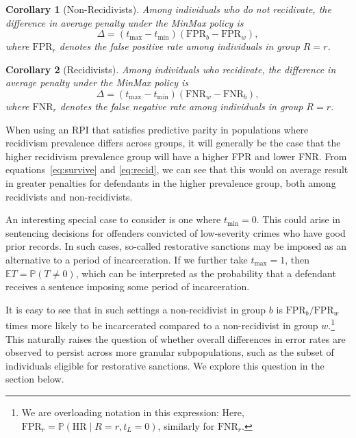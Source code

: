 \documentclass[11pt, svgnames]{article}
\newcommand{\E}{\mathbb{E}}
\renewcommand{\P}{\mathbb{P}}
\newcommand{\fpr}{\mathrm{FPR}}
\newcommand{\fnr}{\mathrm{FNR}}
\numberwithin{equation}{section}
\theoremstyle{plain}
\newtheorem{corollary}{Corollary}
\theoremstyle{definition}
\numberwithin{prop}{section}
\numberwithin{corollary}{section}
\begin{document}
\begin{corollary}[Non-Recidivists]
  Among individuals who \emph{do not recidivate}, the difference in average penalty under the MinMax policy is 
  \begin{equation}
    \Delta = (t_\mathrm{max} - t_\mathrm{min})(\fpr_b - \fpr_w),
    \label{eq:survive}
  \end{equation}
  where $\fpr_r$ denotes the false positive rate among individuals in group $R = r$.  
  \label{cor:nonrecid}
\end{corollary}
%
\begin{corollary}[Recidivists]
  Among individuals who \emph{recidivate}, the difference in average penalty under the MinMax policy is 
  \begin{equation}
    \Delta = (t_\mathrm{max} - t_\mathrm{min})(\fnr_w - \fnr_b),
    \label{eq:recid}
  \end{equation}
  where $\fnr_r$ denotes the false negative rate among individuals in group $R = r$.  
  \label{cor:recid}
\end{corollary}

When using an RPI that satisfies predictive parity in populations where recidivism prevalence differs across groups, it will generally be the case that the higher recidivism prevalence group will have a higher FPR and lower FNR.  From equations~\eqref{eq:survive} and \eqref{eq:recid}, we can see that this would on average result in greater penalties for defendants in the higher prevalence group, both among recidivists and non-recidivists.   

An interesting special case to consider is one where $t_\mathrm{min} = 0$.  This could arise in sentencing decisions for offenders convicted of low-severity crimes who have good prior records.  In such cases, so-called restorative sanctions may be imposed as an alternative to a period of incarceration. If we further take $t_\mathrm{max} = 1$, then $\E T = \P(T \neq 0)$, which can be interpreted as the probability that a defendant receives a sentence imposing some period of incarceration.  

It is easy to see that in such settings a non-recidivist in group $b$ is $\fpr_b /  \fpr_w$ times more likely to be incarcerated compared to a non-recidivist in group $w$.\footnote{We are overloading notation in this expression:  Here, \mbox{$\fpr_r = \P(\mathrm{HR} \mid R = r, t_L = 0)$}, similarly for $\fnr_r$.} This naturally raises the question of whether overall differences in error rates are observed to persist across more granular subpopulations, such as the subset of individuals eligible for restorative sanctions.  We explore this question in the section below.
\end{document}
